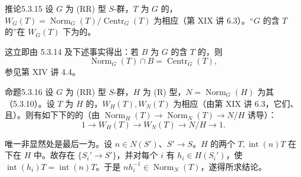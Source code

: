 \begin{SGAresult}{推论}{5.3.15} 设 $G$ 为 (RR) 型 $S$-群，$T$ 为 $G$ 的，$W_G(T)=\operatorname{Norm}_G(T)/\operatorname{Centr}_G(T)$ 为相应（第 XIX 讲 6.3）。“$G$ 的含 $T$ 的”在 $W_G(T)$ 下为的。\end{SGAresult}
这立即由 5.3.14 及下述事实得出：若 $B$ 为 $G$ 的含 $T$ 的，则
\[\operatorname{Norm}_G(T)\cap B=\operatorname{Centr}_G(T),\]
参见第 XIV 讲 4.4。
\begin{SGAresult}{命题}{5.3.16} 设 $G$ 为 (RR) 型 $S$-群，$H$ 为 (R) 型，$N=\operatorname{Norm}_G(H)$ 为其（5.3.10）。设 $T$ 为 $H$ 的，$W_H(T),W_N(T)$ 为相应（由第 XIX 讲 6.3，它们、且）。则有如下下的的（由 $\operatorname{Norm}_H(T)\to\operatorname{Norm}_N(T)\to N/H$ 诱导）：
\[1\longrightarrow W_H(T)\longrightarrow W_N(T)\longrightarrow N/H\longrightarrow1.\]
\end{SGAresult}
唯一非显然处是最后一为。设 $n\in N(S')$、$S'\to S$。$H$ 的两个 $T,\operatorname{int}(n)T$ 在下在 $H$ 中。故存在 $\{S_i'\to S'\}$，并对每个 $i$ 有 $h_i\in H(S_i')$，使 $\operatorname{int}(h_i)T=\operatorname{int}(n)T$。于是 $nh_i^{-1}\in\operatorname{Norm}_N(T)$，遂得所求结论。

